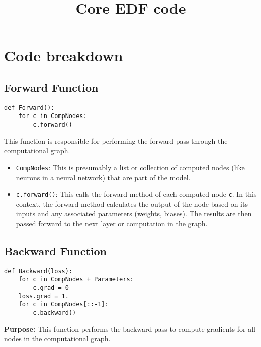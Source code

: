 \documentclass{article}
\begin{document}
\title{Core EDF code}
\maketitle

\section{Code breakdown}

\subsection{Forward Function}
\begin{verbatim}
def Forward():
    for c in CompNodes: 
        c.forward()
\end{verbatim}

This function is responsible for performing the forward pass through the computational graph. 

\begin{itemize}
    \item \texttt{CompNodes}: This is presumably a list or collection of computed nodes (like neurons in a neural network) that are part of the model.
    \item \texttt{c.forward()}: This calls the forward method of each computed node \texttt{c}. In this context, the forward method calculates the output of the node based on its inputs and any associated parameters (weights, biases). The results are then passed forward to the next layer or computation in the graph.
\end{itemize}

\subsection{Backward Function}
\begin{verbatim}
def Backward(loss):
    for c in CompNodes + Parameters: 
        c.grad = 0
    loss.grad = 1.
    for c in CompNodes[::-1]: 
        c.backward()
\end{verbatim}

\textbf{Purpose:} This function performs the backward pass to compute gradients for all nodes in the computational graph. 
\end{document}

